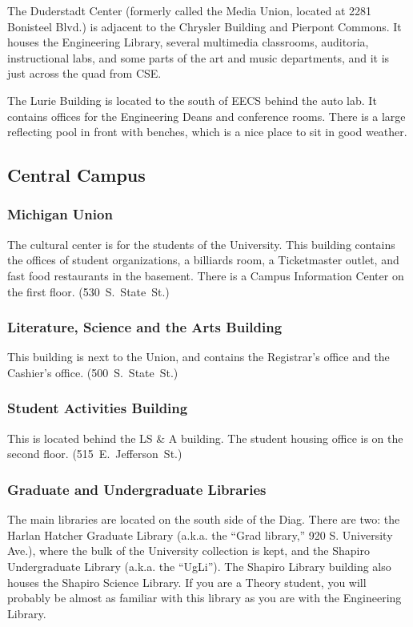 \documentclass[11pt]{article}
\begin{document}
The Duderstadt Center (formerly called the Media Union, located at
2281 Bonisteel Blvd.) is adjacent to the Chrysler Building and
Pierpont Commons.  It houses the Engineering Library, several
multimedia classrooms, auditoria, instructional labs, and some parts
of the art and music departments, and it is just across the quad from
CSE.

The Lurie Building is located to the south of EECS behind the auto
lab.  It contains offices for the Engineering Deans and conference
rooms.  There is a large reflecting pool in front with benches, which
is a nice place to sit in good weather.
\subsection{Central Campus}
\label{sec-3_4}
\subsubsection{Michigan Union}
\label{sec-3_4_1}

The cultural center is for the students of the University.  This building contains the offices of student organizations, a billiards room, a Ticketmaster outlet, and fast food restaurants in the basement.  There is a Campus Information Center on the first floor. (530 S. State St.)
\subsubsection{Literature, Science and the Arts Building}
\label{sec-3_4_2}

This building is next to the Union, and contains the Registrar's office and the Cashier's office. (500 S. State St.)
\subsubsection{Student Activities Building}
\label{sec-3_4_3}

This is located behind the LS \& A building. The student housing office is on the second floor. (515 E. Jefferson St.)
\subsubsection{Graduate and Undergraduate Libraries}
\label{sec-3_4_4}

The main libraries are located on the south side of the Diag.  There are two:  the Harlan Hatcher Graduate Library (a.k.a. the “Grad library,” 920 S. University Ave.), where the bulk of the University collection is kept, and the Shapiro Undergraduate Library (a.k.a. the “UgLi”).  The Shapiro Library building also houses the Shapiro Science Library.  If you are a Theory student, you will probably be almost as familiar with this library as you are with the Engineering Library.
\end{document}
